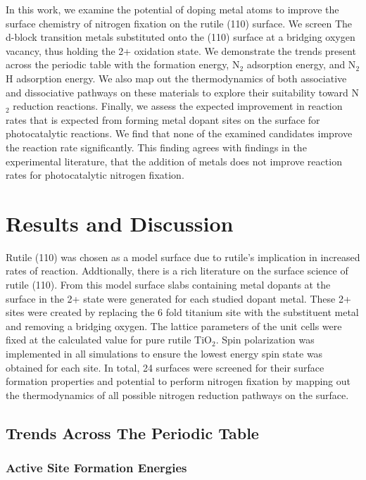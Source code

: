 \documentclass[catalysts,article,submit,moreauthors,pdftex,10pt,a4paper]{mdpi}
\theoremstyle{mdpi}
\newcounter{ex}
\newcounter{re}
\theoremstyle{mdpidefinition}
\begin{document}
In this work, we examine the potential of doping metal atoms to improve the surface chemistry of nitrogen fixation on the rutile (110) surface. We screen The d-block transition metals substituted onto the (110) surface at a bridging oxygen vacancy, thus holding the 2+ oxidation state. We demonstrate the trends present across the periodic table with the formation energy, N$_2$ adsorption energy, and N$_2$H adsorption energy. We also map out the thermodynamics of both associative and dissociative pathways on these materials to explore their suitability toward N$_2$ reduction reactions. Finally, we assess the expected improvement in reaction rates that is expected from forming metal dopant sites on the surface for photocatalytic reactions. We find that none of the examined candidates improve the reaction rate significantly. This finding agrees with findings in the experimental literature, that the addition of metals does not improve reaction rates for photocatalytic nitrogen fixation.

\section{Results and Discussion}
Rutile (110) was chosen as a model surface due to rutile's implication in increased rates of reaction.\cite{Schrauzer_1977} Addtionally, there is a rich literature on the surface science of rutile (110)\cite{Diebold2003,Yates_1991,Lu1994,Walle2009}. From this model surface slabs containing metal dopants at the surface in the 2+ state were generated for each studied dopant metal. These 2+ sites were created by replacing the 6 fold titanium site with the substituent metal and removing a bridging oxygen. The lattice parameters of the unit cells were fixed at the calculated value for pure rutile TiO$_2$. Spin polarization was implemented in all simulations to ensure the lowest energy spin state was obtained for each site. In total, 24 surfaces were screened for their surface formation properties and potential to perform nitrogen fixation by mapping out the thermodynamics of all possible nitrogen reduction pathways on the surface.

\subsection{Trends Across The Periodic Table}

\subsubsection{Active Site Formation Energies}
\end{document}
